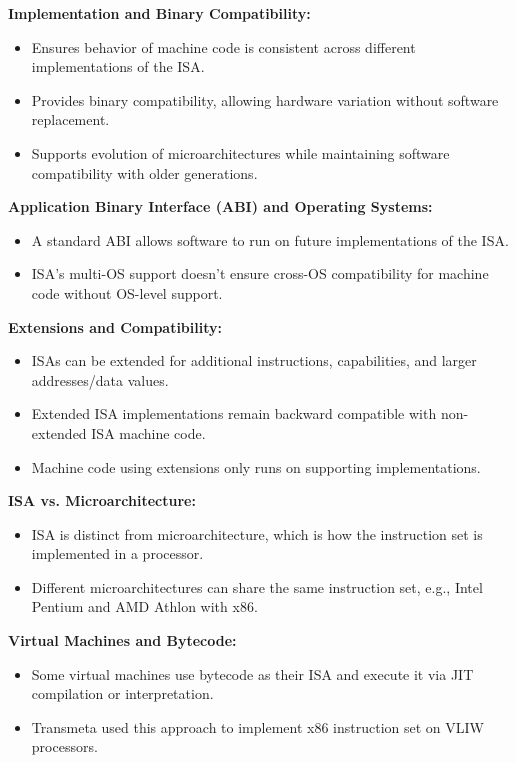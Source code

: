 \documentclass[12pt]{article}
\begin{document}
\textbf{Implementation and Binary Compatibility:}
\begin{itemize}
    \item Ensures behavior of machine code is consistent across different implementations of the ISA.
    \item Provides binary compatibility, allowing hardware variation without software replacement.
    \item Supports evolution of microarchitectures while maintaining software compatibility with older generations.
\end{itemize}

\textbf{Application Binary Interface (ABI) and Operating Systems:}
\begin{itemize}
    \item A standard ABI allows software to run on future implementations of the ISA.
    \item ISA's multi-OS support doesn't ensure cross-OS compatibility for machine code without OS-level support.
\end{itemize}

\textbf{Extensions and Compatibility:}
\begin{itemize}
    \item ISAs can be extended for additional instructions, capabilities, and larger addresses/data values.
    \item Extended ISA implementations remain backward compatible with non-extended ISA machine code.
    \item Machine code using extensions only runs on supporting implementations.
\end{itemize}

\textbf{ISA vs. Microarchitecture:}
\begin{itemize}
    \item ISA is distinct from microarchitecture, which is how the instruction set is implemented in a processor.
    \item Different microarchitectures can share the same instruction set, e.g., Intel Pentium and AMD Athlon with x86.
\end{itemize}

\textbf{Virtual Machines and Bytecode:}
\begin{itemize}
    \item Some virtual machines use bytecode as their ISA and execute it via JIT compilation or interpretation.
    \item Transmeta used this approach to implement x86 instruction set on VLIW processors.
\end{itemize}
\end{document}
